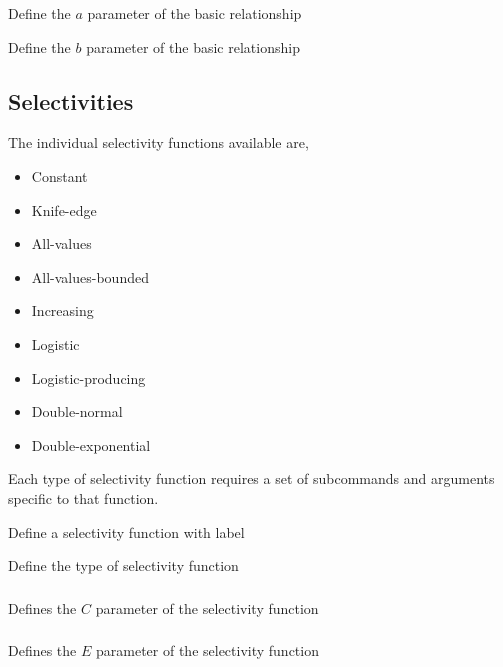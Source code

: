  {Define the $a$ parameter of the basic relationship}

 {Define the $b$ parameter of the basic relationship}

\subsection{Selectivities}

The individual selectivity functions available are, 

\begin{itemize}
	\item Constant
	\item Knife-edge
	\item All-values
	\item All-values-bounded
	\item Increasing
	\item Logistic
	\item Logistic-producing
	\item Double-normal
	\item Double-exponential
\end{itemize}

Each type of selectivity function requires a set of subcommands and arguments specific to that function.

 {Define a selectivity function with label}

 {Define the type of selectivity function}

\subsubsection[Constant]{}

 {Defines the $C$ parameter of the selectivity function}

\subsubsection[Knife-edge]{}

 {Defines the $E$ parameter of the selectivity function}


